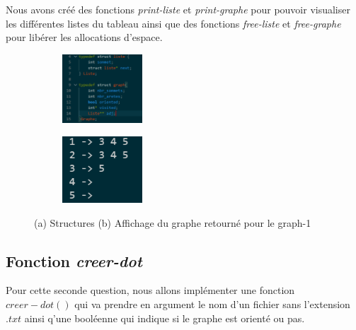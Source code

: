 \documentclass[a4paper]{article}
\begin{document}
Nous avons créé des fonctions \emph{print-liste} et \emph{print-graphe} pour pouvoir visualiser les différentes listes du tableau ainsi que 
des fonctions \emph{free-liste} et \emph{free-graphe} pour libérer les allocations d'espace.\\
\HRule 
\begin{figure}[htp]
    \centering
    \begin{subfigure}{0.45\textwidth}
      \centering
      \includegraphics[width=3cm]{./Photos/Structures.png}
      \caption{}
    \end{subfigure}%
    \hfill
    \begin{subfigure}{0.45\textwidth}
      \centering
      \includegraphics[width=3cm]{./Photos/print_graphe.png}
      \caption{}
    \end{subfigure}
  \caption { (a) Structures (b) Affichage du graphe retourné pour le graph-1}
\end{figure}

\subsection{Fonction \emph{creer-dot}}
Pour cette seconde question, nous allons implémenter une fonction $creer-dot()$ 
qui va prendre en argument le nom d'un fichier sans l'extension $.txt$ ainsi q'une booléenne qui indique si le 
graphe est orienté ou pas.\\
\end{document}
